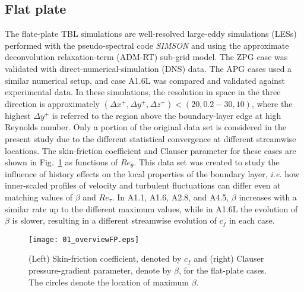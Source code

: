 \subsection{Flat plate}
The flate-plate TBL simulations are well-resolved large-eddy simulations (LESs) performed with the pseudo-spectral code \textit{SIMSON}\cite{SIMSON} and using the approximate deconvolution relaxation-term (ADM-RT) sub-grid model\cite{schl04}. The ZPG case\cite{eite14} was validated with direct-numerical-simulation (DNS) data\cite{schl10}. The APG cases used a similar numerical setup\cite{bobk2016,bobk17,pozu22}, and case A1.6L was compared and validated against experimental data\cite{sanm20}. In these simulations, the resolution in space in the three direction is approximately $(\Delta x^+,\Delta y^+,\Delta z^+) < (20,0.2-30,10)$, where the highest $\Delta y^+$ is referred to the region above the boundary-layer edge at high Reynolds number. Only a portion of the original data set is considered in the present study due to the different statistical convergence at different streamwise locations. The skin-friction coefficient and Clauser parameter for these cases are shown in Fig.~\ref{fig:overviewFP} as functions of $Re_\theta$. This data set was created to study the influence of history effects on the local properties of the boundary layer, \textit{i.e.} how inner-scaled profiles of velocity and turbulent fluctuations can differ even at matching values of $\beta$ and $Re_\tau$. In A1.1, A1.6, A2.8, and A4.5, $\beta$ increases with a similar rate up to the different maximum values, while in A1.6L the evolution of $\beta$ is slower, resulting in a different streamwise evolution of $c_f$ in each case. 


\begin{figure}
\centering
\texttt{[image: 01\_overviewFP.eps]}%
\caption{\label{fig:overviewFP} (Left) Skin-friction coefficient, denoted by $c_f$ and (right) Clauser pressure-gradient parameter, denote by $\beta$, for the flat-plate cases. The circles denote the location of maximum $\beta$.}
\end{figure}


